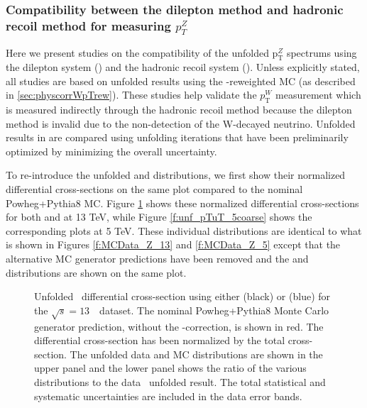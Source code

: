\subsubsection{Compatibility between the dilepton method and hadronic recoil method for measuring $p_{T}^{Z}$}
\label{ssec:pTZcompatibility}

Here we present studies on the compatibility of the unfolded p$_\mathrm{T}^Z$ spectrums using the dilepton system (\ptdilep) and the hadronic recoil system (\ut). Unless explicitly stated, all studies are based on unfolded results using the \pt-reweighted MC (as described in \ref{sec:physcorrWpTrew}). These studies help validate the $p_{\mathrm{T}}^{W}$ measurement which is measured indirectly through the hadronic recoil method because the dilepton method is invalid due to the non-detection of the W-decayed neutrino. Unfolded results in \Sect{\ref{sec:Zresult}} are compared using unfolding iterations that have been preliminarily optimized by minimizing the overall uncertainty.

To re-introduce the unfolded \ptdilep and \ut distributions, we first show their normalized differential cross-sections on the same plot compared to the nominal Powheg+Pythia8 MC. Figure \ref{f:unf_pTuT_13coarse} shows these normalized differential cross-sections for both \Zee and \Zmm at 13 TeV, while Figure \ref{f:unf_pTuT_5coarse} shows the corresponding plots at 5 TeV. These individual distributions are identical to what is shown in Figures \ref{f:MCData_Z_13} and \ref{f:MCData_Z_5} except that the alternative MC generator predictions have been removed and the \ptdilep and \ut distributions are shown on the same plot.

\begin{figure}[h]
\centering
{}
\caption{Unfolded \ptz\ differential cross-section using either \ptdilep (black) or \ut (blue) for the $\sqrt{s} = 13$~\TeV\ dataset. The nominal Powheg+Pythia8 Monte Carlo generator prediction, without the \pt-correction, is shown in red. The differential cross-section has been normalized by the total cross-section. The unfolded data and MC distributions are shown in the upper panel and the lower panel shows the ratio of the various distributions to the data \ptdilep\ unfolded result. The total statistical and systematic uncertainties are included in the data error bands.}\label{f:unf_pTuT_13coarse}
\end{figure}

